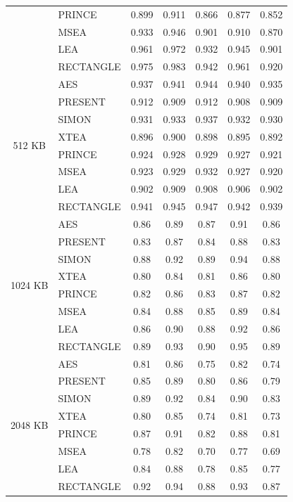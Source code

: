 \documentclass[12pt]{article}
\begin{document}
\begin{table}[p]
{\begin{tabular}{|c|l|c|c|c|c|c|}
& PRINCE     & 0.899 & 0.911 & 0.866 & 0.877 & 0.852 \\
& MSEA       & 0.933 & 0.946 & 0.901 & 0.910 & 0.870 \\
& LEA        & 0.961 & 0.972 & 0.932 & 0.945 & 0.901 \\
& RECTANGLE  & 0.975 & 0.983 & 0.942 & 0.961 & 0.920 \\
\hline
\multirow{8}{*}{512 KB}
& AES        & 0.937 & 0.941 & 0.944 & 0.940 & 0.935 \\
& PRESENT    & 0.912 & 0.909 & 0.912 & 0.908 & 0.909 \\
& SIMON      & 0.931 & 0.933 & 0.937 & 0.932 & 0.930 \\
& XTEA       & 0.896 & 0.900 & 0.898 & 0.895 & 0.892 \\
& PRINCE     & 0.924 & 0.928 & 0.929 & 0.927 & 0.921 \\
& MSEA       & 0.923 & 0.929 & 0.932 & 0.927 & 0.920 \\
& LEA        & 0.902 & 0.909 & 0.908 & 0.906 & 0.902 \\
& RECTANGLE  & 0.941 & 0.945 & 0.947 & 0.942 & 0.939 \\
\hline
\multirow{8}{*}{1024 KB}
& AES        & 0.86 & 0.89 & 0.87 & 0.91 & 0.86 \\
& PRESENT    & 0.83 & 0.87 & 0.84 & 0.88 & 0.83 \\
& SIMON      & 0.88 & 0.92 & 0.89 & 0.94 & 0.88 \\
& XTEA       & 0.80 & 0.84 & 0.81 & 0.86 & 0.80 \\
& PRINCE     & 0.82 & 0.86 & 0.83 & 0.87 & 0.82 \\
& MSEA       & 0.84 & 0.88 & 0.85 & 0.89 & 0.84 \\
& LEA        & 0.86 & 0.90 & 0.88 & 0.92 & 0.86 \\
& RECTANGLE  & 0.89 & 0.93 & 0.90 & 0.95 & 0.89 \\
\hline
\multirow{8}{*}{2048 KB}
& AES        & 0.81 & 0.86 & 0.75 & 0.82 & 0.74 \\
& PRESENT    & 0.85 & 0.89 & 0.80 & 0.86 & 0.79 \\
& SIMON      & 0.89 & 0.92 & 0.84 & 0.90 & 0.83 \\
& XTEA       & 0.80 & 0.85 & 0.74 & 0.81 & 0.73 \\
& PRINCE     & 0.87 & 0.91 & 0.82 & 0.88 & 0.81 \\
& MSEA       & 0.78 & 0.82 & 0.70 & 0.77 & 0.69 \\
& LEA        & 0.84 & 0.88 & 0.78 & 0.85 & 0.77 \\
& RECTANGLE  & 0.92 & 0.94 & 0.88 & 0.93 & 0.87 \\
\hline
\end{tabular}%
}
\end{table}
\end{document}
